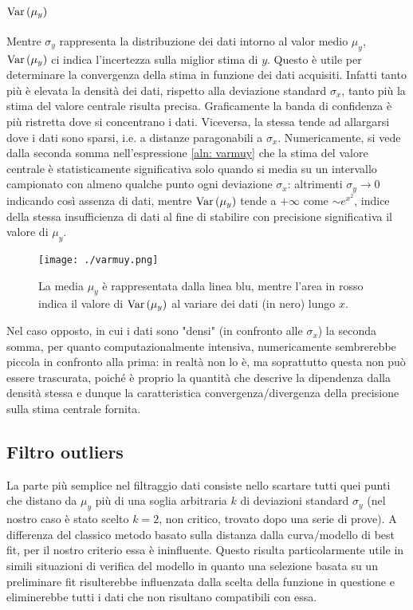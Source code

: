 \documentclass{article}[a4paper, oneside, 11pt]
\begin{document}
\subsection{$\text{Var}\left(\mu_y\right)$}
Mentre $\sigma_y$ rappresenta la distribuzione dei dati intorno al valor medio 
$\mu_y$, $\text{Var}\left(\mu_y\right)$ ci indica l’incertezza sulla miglior stima di $y$.
Questo è utile per determinare la convergenza della stima in funzione dei dati
acquisiti. Infatti tanto più è elevata la densità dei dati, rispetto alla
deviazione standard $\sigma_x$, tanto più la stima del valore centrale risulta
precisa.
Graficamente la banda di confidenza è più ristretta dove si concentrano i dati.
Viceversa, la stessa tende ad allargarsi dove i dati sono sparsi, i.e. a
distanze paragonabili a $\sigma_x$. Numericamente, si vede dalla seconda somma
nell'espressione \eqref{aln: varmuy} che la stima del valore centrale è
statisticamente significativa solo quando si media su un intervallo campionato
con almeno qualche punto ogni deviazione $\sigma_x$: altrimenti $\sigma_y \to 0$
indicando così assenza di dati, mentre $\text{Var}\left(\mu_y\right)$ tende a $+\infty$ come
$\sim e^{x^2}$, indice della stessa insufficienza di dati al fine di stabilire
con precisione significativa il valore di $\mu_y$.
\begin{figure}[!htb]
	\centering 
 		\texttt{[image: ./varmuy.png]}
 	\caption{La media $\mu_y$ è rappresentata dalla linea blu, mentre
	l'area in rosso indica il valore di $\text{Var}\left(\mu_y\right)$ al variare dei
	dati (in nero) lungo $x$. \label{fig: varmuy}}
\end{figure}
Nel caso opposto, in cui i dati sono "densi" (in confronto alle $\sigma_x$)
la seconda somma, per quanto computazionalmente intensiva, numericamente
sembrerebbe piccola in confronto alla prima: in realtà non lo è, ma
soprattutto questa non può essere trascurata, poiché è proprio la quantità
che descrive la dipendenza dalla densità stessa e dunque la caratteristica
convergenza/divergenza della precisione sulla stima centrale fornita.

\subsection{Filtro outliers}
La parte più semplice nel filtraggio dati consiste nello scartare tutti quei
punti che distano da $\mu_y$ più di una soglia arbitraria $k$ di deviazioni
standard $\sigma_y$ (nel nostro caso è stato scelto $k = 2$, non critico,
trovato dopo una serie di prove). A differenza del classico metodo basato
sulla distanza dalla curva/modello di best fit, per il nostro criterio essa
è ininfluente. Questo risulta particolarmente utile in simili situazioni di
verifica del modello in quanto una selezione basata su un preliminare fit
risulterebbe influenzata dalla scelta della funzione in questione e
eliminerebbe tutti i dati che non risultano compatibili con essa.
\end{document}
